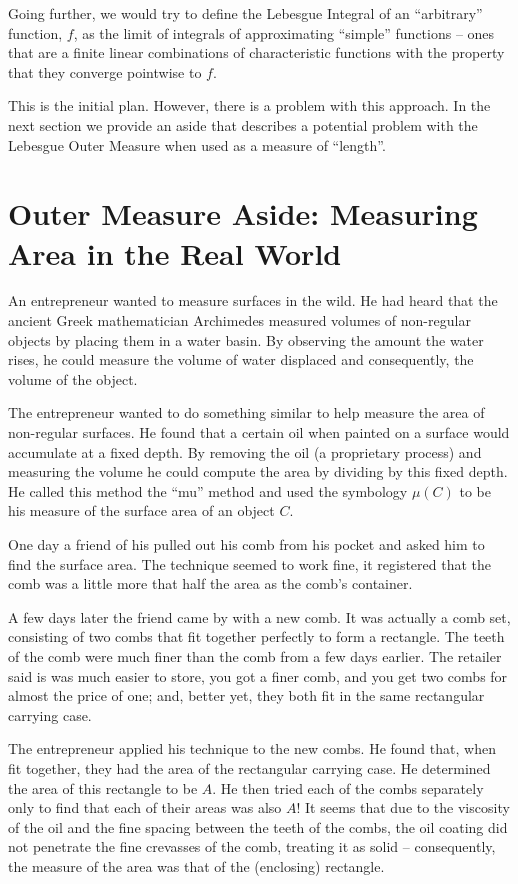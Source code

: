 \documentclass{article}
\begin{document}
Going further, we would try to define the Lebesgue Integral of an ``arbitrary''
function, $f$, as the limit of integrals of approximating ``simple'' 
functions  -- ones that are a finite linear combinations of characteristic 
functions with the property that they converge pointwise to $f$.

This is the initial plan. However, there is a problem with this approach. 
In the next section we provide an aside that describes a potential problem 
with the Lebesgue Outer Measure when used as a measure of ``length''.

\section{Outer Measure Aside: Measuring Area in the Real World}
An entrepreneur 
wanted to measure surfaces in the wild. He had heard that the 
ancient Greek mathematician Archimedes measured volumes of non-regular objects 
by placing them in a water basin. By observing the amount the water rises, he 
could measure the volume of water displaced and consequently, the volume of the object.

The entrepreneur wanted to do something similar to help measure the area of 
non-regular surfaces. He found that a 
certain oil when painted on a surface would accumulate at a fixed depth. By 
removing the oil (a proprietary process) and measuring the volume he could 
compute the area by dividing by this fixed depth. He called this method the 
``mu'' method and used the symbology $\mu(C)$ to be his measure of the surface 
area of an object $C$.

One day a friend of his pulled out his comb from his pocket and asked him to 
find the surface area. The technique seemed to work fine, it registered that 
the comb was a little more that half the area as the comb's container.

A few days later the friend came by with a new comb. It was actually a comb 
set, consisting of two combs that fit together perfectly to form a rectangle.
The teeth of the comb were much finer than the comb from a few days earlier. 
The retailer said is was much easier to store, you got a finer comb, and you 
get two combs for almost the price of one; and, better yet, they both 
fit in the same rectangular carrying case.

The entrepreneur applied his technique to the new combs. 
He found that, when fit together, they had the area of the rectangular carrying case.
He determined the area of this rectangle to be $A$. He then tried each of the 
combs separately only to find that each of their areas was also $A$!
It seems that due to the viscosity of the oil and the fine spacing between the 
teeth of the combs, the oil coating did not penetrate the fine crevasses of the 
comb, treating it as solid -- consequently, the measure of the area was 
that of the (enclosing) rectangle.
\end{document}
